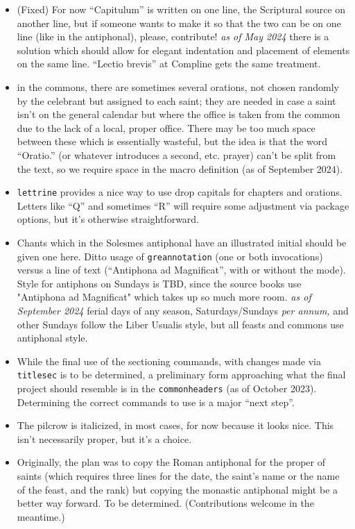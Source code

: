 \documentclass[11pt]{article}
\begin{document}
\begin{itemize}
\item
(Fixed) For now ``Capitulum'' is written on one line, the Scriptural source on another line, but if someone wants to make it so that the two can be on one line (like in the antiphonal), please, contribute! \emph{as of May 2024} there is a solution which should allow for elegant indentation and placement of elements on the same line. ``Lectio brevis'' at Compline gets the same treatment.
\item in the commons, there are sometimes several orations, not chosen randomly by the celebrant but assigned to each saint; they are needed in case a saint isn't on the general calendar but where the office is taken from the common due to the lack of a local, proper office. There may be too much space between these which is essentially wasteful, but the idea is that the word ``Oratio.'' (or whatever introduces a second, etc. prayer) can't be split from the text, so we require space in the macro definition (as of September 2024).
\item
\verb|lettrine| provides a nice way to use drop capitals for chapters and orations. Letters like ``Q'' and sometimes ``R'' will require some adjustment via package options, but it's otherwise straightforward.
\item
Chants which in the Solesmes antiphonal have an illustrated initial should be given one here. Ditto usage of \verb|greannotation| (one or both invocations) versus a line of text (``Antiphona ad Magnificat'', with or without the mode). Style for antiphons on Sundays is TBD, since the source books use "Antiphona ad Magnificat" which takes up so much more room. \emph{as of September 2024} ferial days of any season, Saturdays/Sundays \textit{per annum,} and other Sundays follow the Liber Usualis style, but all feasts and commons use antiphonal style.
\item While the final use of the sectioning commands, with changes made via \verb|titlesec| is  to be determined, a preliminary form approaching what the final project should resemble is in the \verb|commonheaders| (as of October 2023). Determining the correct commands to use is a major ``next step''.
\item
The pilcrow is italicized, in most cases, for now because it looks nice. This isn't necessarily proper, but it's a choice.
\item
Originally, the plan was to copy the Roman antiphonal for the proper of saints (which requires three lines for the date, the saint's name or the name of the feast, and the rank) but copying the monastic antiphonal might be a better way forward. To be determined. (Contributions welcome in the meantime.)

\end{itemize}
\end{document}
